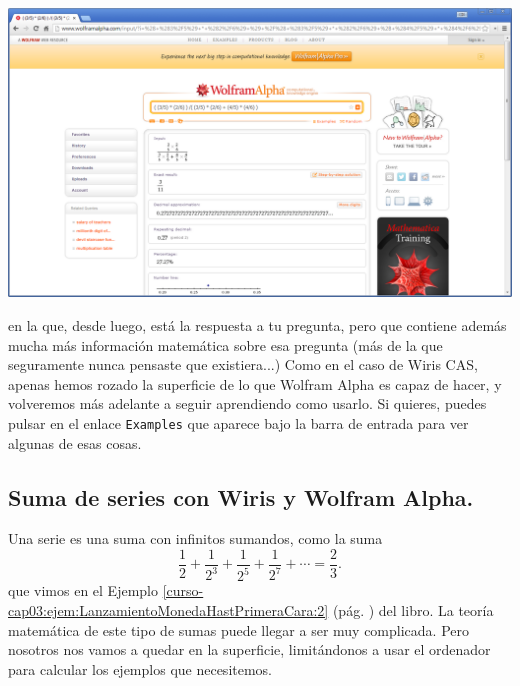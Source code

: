 \documentclass[10pt,a4paper]{article}\usepackage[]{graphicx}\usepackage[]{color}
\newcounter {cont01}
\begin{document}
    \begin{center}
    \includegraphics[width=15.5cm]{../fig/Tut04-17.png}
    \end{center}
en la que, desde luego, está la respuesta a tu pregunta, pero que contiene además mucha más información matemática sobre esa pregunta (más de la que seguramente nunca pensaste que existiera...) Como en el caso de Wiris CAS, apenas hemos rozado la superficie de lo que Wolfram Alpha es capaz de hacer, y volveremos más adelante a seguir aprendiendo como usarlo. Si quieres, puedes pulsar en el enlace {\tt Examples} que aparece bajo la barra de entrada para ver algunas de esas cosas.


\subsection{Suma de series con Wiris y Wolfram Alpha.}
\label{tut05:subsec:SeriesWirisWolfram}

Una serie es una suma con infinitos sumandos, como la suma
\[\dfrac{1}{2}+\dfrac{1}{2^3}+\dfrac{1}{2^5}+\dfrac{1}{2^7}+\cdots=\dfrac{2}{3}.\]
que vimos en el Ejemplo \ref{curso-cap03:ejem:LanzamientoMonedaHastPrimeraCara:2} (pág. \pageref{curso-cap03:ejem:LanzamientoMonedaHastPrimeraCara:2}) del libro. La teoría matemática de este tipo de sumas puede llegar a ser muy complicada. Pero nosotros nos vamos a quedar en la superficie, limitándonos a usar el ordenador para calcular los ejemplos que necesitemos.
\end{document}
